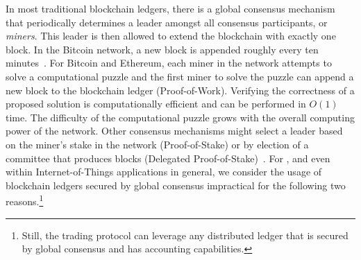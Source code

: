 In most traditional blockchain ledgers, there is a global consensus mechanism that periodically determines a leader amongst all consensus participants, or \emph{miners}.
This leader is then allowed to extend the blockchain with exactly one block.
In the Bitcoin network, a new block is appended roughly every ten minutes~\cite{nakamoto2008bitcoin}.
For Bitcoin and Ethereum, each miner in the network attempts to solve a computational puzzle and the first miner to solve the puzzle can append a new block to the blockchain ledger (Proof-of-Work).
Verifying the correctness of a proposed solution is computationally efficient and can be performed in $ O(1) $ time.
The difficulty of the computational puzzle grows with the overall computing power of the network.
Other consensus mechanisms might select a leader based on the miner's stake in the network (Proof-of-Stake) or by election of a committee that produces blocks (Delegated Proof-of-Stake)~\cite{bentov2014proof}.
For \ModelName{}, and even within Internet-of-Things applications in general, we consider the usage of blockchain ledgers secured by global consensus impractical for the following two reasons.\footnote{Still, the \ModelName{} trading protocol can leverage any distributed ledger that is secured by global consensus and has accounting capabilities.}

